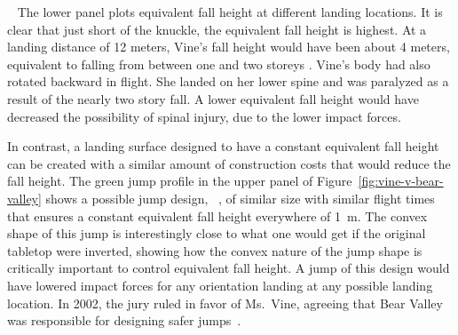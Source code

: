 \documentclass{article}
\begin{document}
~
The lower panel plots equivalent fall height at different landing
locations. It is clear that just short of the knuckle, the
equivalent fall height is highest. At a landing distance of 12 meters, Vine's fall height would have been
about 4 meters, equivalent to falling from between one and two storeys \cite{Vish2005}.
Vine's body had also
rotated backward in flight. She landed on her lower spine and was paralyzed as a result
of the nearly two story fall. A lower equivalent fall height would have decreased the
possibility of spinal injury, due to the lower impact forces.


In contrast, a landing surface designed to have a constant equivalent fall
height can be created with a similar amount of construction costs that would
reduce the fall height.  The green jump profile in the upper panel of
Figure~\ref{fig:vine-v-bear-valley} shows a possible jump design,
~\cite{Levy2015}, of similar size with similar flight times that ensures a
constant equivalent fall height everywhere of 1~\si{\meter}.  The convex shape
of this jump is interestingly close to what one would get if the original
tabletop were inverted, showing how the convex nature of the jump shape is
critically important to control equivalent fall height. A jump of this design
would have lowered impact forces for any orientation landing at any possible
landing location. In 2002, the jury ruled in favor of Ms.~Vine, agreeing that
Bear Valley was responsible for designing safer jumps~\cite{Alvarado2002}.
\end{document}
